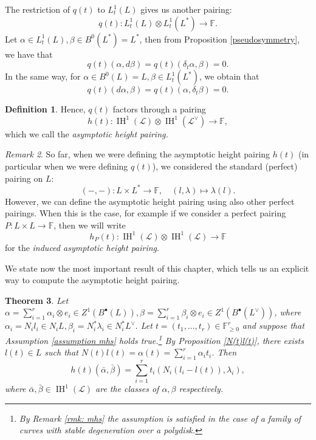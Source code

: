 \documentclass[a4paper,12 pt,titlepage,twoside]{book}
\newcommand{\numberset}{\mathbb}
\newcommand{\F}{\numberset{F}}
\DeclareMathOperator{\IH}{IH}
\theoremstyle{plain}
\newtheorem{thm}{Theorem}[section]
\theoremstyle{theorem}
\theoremstyle{definition}
\newtheorem{defn}[thm]{Definition}
\theoremstyle{remark}
\newtheorem{oss}[thm]{Remark}
\begin{document}
	The restriction of $q(t)$ to $L_t^1(L)$ gives us another pairing:$$q(t) \colon L_t^1(L) \otimes L_t^1(L^*) \rightarrow \F.$$ Let $\alpha \in L_t^1(L), \beta \in B^0(L^*) = L^*$, then from Proposition \ref{pseudosymmetry}, we have that $$q(t)(\alpha, d\beta) = q(t)(\delta_t \alpha, \beta) = 0.$$ In the same way, for $\alpha \in B^0(L)=L, \beta \in L_t^1(L^*)$, we obtain that $$ q(t)(d \alpha, \beta) = q(t)(\alpha, \delta_t \beta) =0.$$ 
	\begin{defn}
		Hence, $q(t)$ factors through a pairing $$h(t) \colon \IH^1(\mathcal{L}) \otimes \IH^1(\mathcal{L}^\vee) \rightarrow \F,$$ which we call the \emph{asymptotic height pairing.}
	\end{defn}
	\begin{oss}\label{rmk: ahp with different pairing}
		So far, when we were defining the asymptotic height pairing $h(t)$ (in particular when we were defining $q(t)$), we considered the standard (perfect) pairing on $L$: $$(-,-) \colon L \times L^* \rightarrow \F, \quad (l,\lambda) \mapsto \lambda(l).$$ However, we can define the asymptotic height pairing using also other perfect pairings. When this is the case, for example if we consider a perfect pairing $P \colon L \times L \rightarrow \F$, then we will write $$h_P(t) \colon \IH^1(\mathcal{L}) \otimes \IH^1(\mathcal{L}) \rightarrow\F$$ for the \emph{induced asymptotic height pairing}.
	\end{oss}
	We state now the most important result of this chapter, which tells us an explicit way to compute the asymptotic height pairing.
	\begin{thm}\label{explicit description}
		Let $\alpha = \sum_{i=1}^r\alpha_i \otimes e_i \in Z^1(B^\bullet(L)), \beta= \sum_{i=1}^r \beta_i \otimes e_i \in Z^1(B^\bullet(L^\vee))$, where $\alpha_i = N_i l_i \in N_i L, \beta_i = N_i^*\lambda_i \in N_i^*L^\vee.$ Let $t=(t_1,\dots,t_r) \in \F^r_{\ge 0}$ and suppose that Assumption \ref{assumption mhs} holds true.\footnote{By Remark \ref{rmk: mhs} the assumption is satisfied in the case of a family of curves with stable degeneration over a polydisk.} By Proposition \ref{N(t)l(t)}, there exists $l(t) \in L$ such that $N(t)l(t)=\alpha(t)=\sum_{i=1}^r\alpha_i t_i$. Then $$h(t)(\bar{\alpha}, \bar{\beta}) = \sum_{i=1}^r t_i (N_i(l_i-l(t)), \lambda_i),$$ where $\bar{\alpha},\bar{\beta} \in \IH^1(\mathcal{L})$ are the classes of $\alpha,\beta$ respectively.
	\end{thm}
\end{document}

